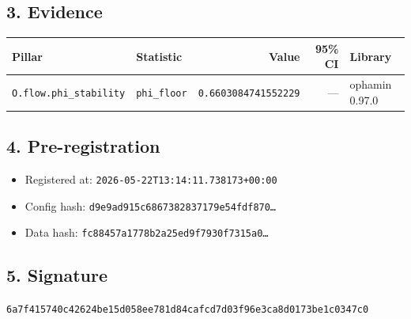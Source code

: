 \documentclass{article}
\begin{document}
\subsection*{3. Evidence}
\begin{tabular}{llrrl}\toprule
\textbf{Pillar} & \textbf{Statistic} & \textbf{Value} & \textbf{95\% CI} & \textbf{Library} \\\midrule
\texttt{O.flow.phi\_stability} & \texttt{phi\_floor} & \texttt{0.6603084741552229} & --- & ophamin 0.97.0 \\
\bottomrule\end{tabular}
\subsection*{4. Pre-registration}
\begin{itemize}
\item Registered at: \texttt{2026-05-22T13:14:11.738173+00:00}
\item Config hash: \texttt{d9e9ad915c6867382837179e54fdf870\dots}
\item Data hash: \texttt{fc88457a1778b2a25ed9f7930f7315a0\dots}
\end{itemize}
\subsection*{5. Signature}
\texttt{6a7f415740c42624be15d058ee781d84cafcd7d03f96e3ca8d0173be1c0347c0}\\
\end{document}
